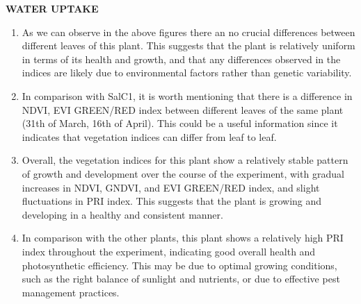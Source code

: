 \documentclass{article}
\begin{document}
                            \newpage
                            \textbf{WATER UPTAKE}
                            \vspace*{1\baselineskip}
                            \begin{enumerate}
                                \item As we can observe in the above figures there an no crucial differences between different leaves of this plant. This suggests that the plant is relatively uniform in terms of its health and growth, and that any differences observed in the indices are likely due to environmental factors rather than genetic variability.\par
                                
                                \item  In comparison with SalC1, it is worth mentioning that there is a difference in NDVI, EVI GREEN/RED index between different leaves of the same plant (31th of March, 16th of April). This could be a useful information since it indicates that vegetation indices can differ from leaf to leaf.\par
                                
                                 \item  Overall, the vegetation indices for this plant show a relatively stable pattern of growth and development over the course of the experiment, with gradual increases in NDVI, GNDVI, and EVI GREEN/RED index, and slight fluctuations in PRI index. This suggests that the plant is growing and developing in a healthy and consistent manner.\par
                                \vspace*{1\baselineskip}
                                
                                \item In comparison with the other plants, this plant shows a relatively high PRI index throughout the experiment, indicating good overall health and photosynthetic efficiency. This may be due to optimal growing conditions, such as the right balance of sunlight and nutrients, or due to effective pest management practices.\par
                            \end{enumerate}

                           
                            
                        
                            
\end{document}
